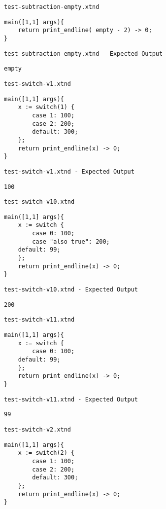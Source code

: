 \medskip \noindent \texttt{test-subtraction-empty.xtnd}


\begin{lstlisting}
main([1,1] args){
	return print_endline( empty - 2) -> 0;
}
\end{lstlisting}


\medskip \noindent \texttt{test-subtraction-empty.xtnd - Expected Output}


\begin{lstlisting}
empty
\end{lstlisting}


\medskip \noindent \texttt{test-switch-v1.xtnd}


\begin{lstlisting}
main([1,1] args){
	x := switch(1) {
		case 1: 100;
		case 2: 200;
		default: 300;
	};
	return print_endline(x) -> 0;
}
\end{lstlisting}


\medskip \noindent \texttt{test-switch-v1.xtnd - Expected Output}


\begin{lstlisting}
100
\end{lstlisting}


\medskip \noindent \texttt{test-switch-v10.xtnd}


\begin{lstlisting}
main([1,1] args){
	x := switch {
		case 0: 100;
		case "also true": 200;
    default: 99;
	};
	return print_endline(x) -> 0;
}
\end{lstlisting}


\medskip \noindent \texttt{test-switch-v10.xtnd - Expected Output}


\begin{lstlisting}
200
\end{lstlisting}


\medskip \noindent \texttt{test-switch-v11.xtnd}


\begin{lstlisting}
main([1,1] args){
	x := switch {
		case 0: 100;
    default: 99;
	};
	return print_endline(x) -> 0;
}
\end{lstlisting}


\medskip \noindent \texttt{test-switch-v11.xtnd - Expected Output}


\begin{lstlisting}
99
\end{lstlisting}


\medskip \noindent \texttt{test-switch-v2.xtnd}


\begin{lstlisting}
main([1,1] args){
	x := switch(2) {
		case 1: 100;
		case 2: 200;
		default: 300;
	};
	return print_endline(x) -> 0;
}
\end{lstlisting}


